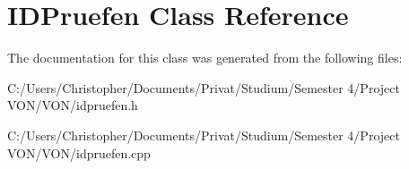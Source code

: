 \hypertarget{class_i_d_pruefen}{}\section{I\+D\+Pruefen Class Reference}
\label{class_i_d_pruefen}


The documentation for this class was generated from the following files\+:\begin{DoxyCompactItemize}
\item 
C\+:/\+Users/\+Christopher/\+Documents/\+Privat/\+Studium/\+Semester 4/\+Project V\+O\+N/\+V\+O\+N/idpruefen.\+h\item 
C\+:/\+Users/\+Christopher/\+Documents/\+Privat/\+Studium/\+Semester 4/\+Project V\+O\+N/\+V\+O\+N/idpruefen.\+cpp\end{DoxyCompactItemize}
